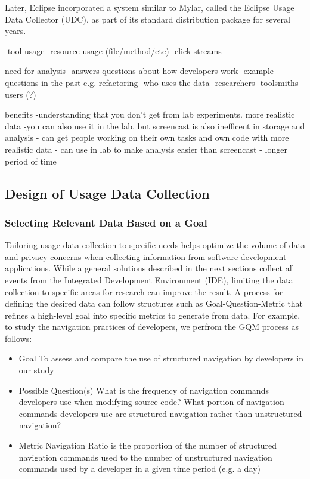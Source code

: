 Later, Eclipse incorporated a system similar to Mylar, called the Eclipse Usage
Data Collector (UDC), as part of its standard distribution package for several
years.

	-tool usage
	-resource usage (file/method/etc)
	-click streams

need for analysis
	-answers questions about how developers work
	-example questions in the past e.g. refactoring
	-who uses the data
		-researchers
		-toolsmiths
		-users (?)

benefits
	-understanding that you don't get from lab experiments. more realistic data
	-you can also use it in the lab, but screencast is also inefficent in storage and analysis
		- can get people working on their own tasks and own code with more realistic data
		- can use in lab to make analysis easier than screencast
		- longer period of time



\subsection{Design of Usage Data Collection}


\subsubsection{Selecting Relevant Data Based on a Goal}
	Tailoring usage data collection to specific needs helps optimize the volume of data and privacy concerns when collecting information from software development applications.  While a general solutions described in the next sections collect all events from the Integrated Development Environment (IDE), limiting the data collection to specific areas for research can improve the result.  A process for defining the desired data can follow structures such as Goal-Question-Metric \cite{basili-GQM}  that refines a high-level goal into specific metrics to generate from data.  For example, to study the navigation practices of developers, we perfrom the GQM process as follows:
    \begin{itemize}
\item
	Goal
\subitem
	To assess and compare the use of structured navigation by developers in our study
\item
	Possible Question(s)
\subitem
	What is the frequency  of navigation commands developers use when modifying source code?
\subitem
	What portion of navigation commands developers use are structured navigation rather than unstructured navigation?
\item
	Metric
\subitem
	Navigation Ratio is the proportion of the number of structured navigation commands used to the number of unstructured navigation commands used by a developer in a given time period (e.g. a day)

	    \end{itemize}

